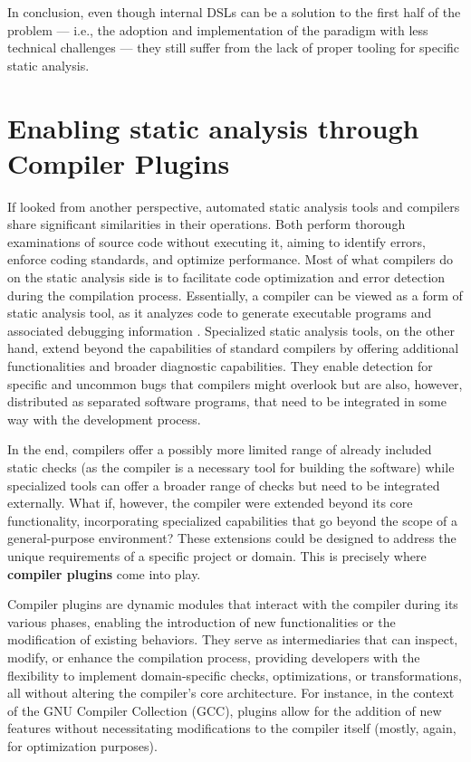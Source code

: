 \documentclass[12pt,a4paper,openright,twoside]{book}
\begin{document}
In conclusion, even though internal \acp{DSL} can be a solution to the first
half of the problem --- i.e., the adoption and implementation of the paradigm
with less technical challenges --- they still suffer from the lack of proper
tooling for specific static analysis.

\section{Enabling static analysis through Compiler Plugins}

If looked from another perspective, automated static analysis tools and
compilers share significant similarities in their operations. Both perform
thorough examinations of source code without executing it, aiming to identify
errors, enforce coding standards, and optimize performance. Most of what
compilers do on the static analysis side is to facilitate code optimization and
error detection during the compilation process. Essentially, a compiler can be
viewed as a form of static analysis tool, as it analyzes code to generate
executable programs and associated debugging information
\cite{DBLP:journals/queue/Thomson21}.
%
Specialized static analysis tools, on the other hand, extend beyond the
capabilities of standard compilers by offering additional functionalities and
broader diagnostic capabilities. They enable detection for specific and uncommon
bugs that compilers might overlook but are also, however, distributed as
separated software programs, that need to be integrated in some way with the
development process.

In the end, compilers offer a possibly more limited range of already included
static checks (as the compiler is a necessary tool for building the software)
while specialized tools can offer a broader range of checks but need to be
integrated externally.
%
What if, however, the compiler were extended beyond its core functionality,
incorporating specialized capabilities that go beyond the scope of a
general-purpose environment? These extensions could be designed to address the
unique requirements of a specific project or domain. This is precisely where
\textbf{compiler plugins} come into play.

Compiler plugins are dynamic modules that interact with the compiler during its
various phases, enabling the introduction of new functionalities or the
modification of existing behaviors. They serve as intermediaries that can
inspect, modify, or enhance the compilation process, providing developers with
the flexibility to implement domain-specific checks, optimizations, or
transformations, all without altering the compiler's core architecture. 
%
For instance, in the context of the GNU Compiler Collection
(GCC), plugins allow for the addition of new features without necessitating
modifications to the compiler itself (mostly, again, for optimization purposes).
\end{document}
